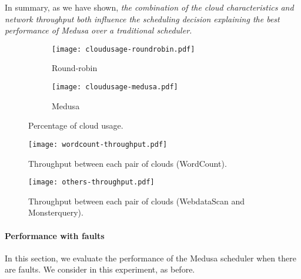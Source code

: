 \documentclass[10pt, conference, compsocconf]{IEEEtran}
\begin{document}
In summary, as we have shown, \textit{the combination of the cloud characteristics and network throughput both influence the scheduling decision explaining the best performance of Medusa over a traditional scheduler.}

\begin{figure}[t!]
  \centering
  \begin{subfigure}{.5\textwidth}
    \texttt{[image: cloudusage-roundrobin.pdf]}
    \vspace{-1.5\baselineskip}
    \caption{Round-robin}
    \label{fig:makespan:cloud:usage:rr}
  \end{subfigure}
  \vspace*{\fill} \begin{subfigure}{.5\textwidth}
      \texttt{[image: cloudusage-medusa.pdf]}
    \vspace{-1.5\baselineskip}
    \caption{Medusa}
    \label{fig:makespan:cloud:usage:medusa}
  \end{subfigure}
  \vspace{.5em}
  \caption{Percentage of cloud usage.}
  \label{fig:cloud:usage}
\end{figure}


\begin{figure}
  \centering
  \texttt{[image: wordcount-throughput.pdf]}
  \caption{Throughput between each pair of clouds (WordCount).}
  \label{eval:fig:throughput:wordcount}
\end{figure}

\begin{figure}
  \centering
  \texttt{[image: others-throughput.pdf]}
  \caption{Throughput between each pair of clouds (WebdataScan and Monsterquery).}
  \label{eval:fig:throughput:others}
  \vspace{1em}
\end{figure}











\paragraph{Performance with faults}

In this section, we evaluate the performance of the Medusa scheduler when there are faults.
We consider  in this experiment, as before.
\end{document}
